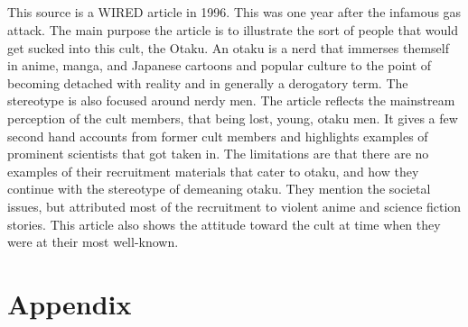 \documentclass[12pt, letterpaper]{article}
\begin{document}
\subsection{}

This source is a WIRED article in 1996. This was one year after the infamous gas attack. The main purpose 
the article is to illustrate the sort of people that would get sucked into this cult, the Otaku. An otaku
is a nerd that immerses themself in anime, manga, and Japanese cartoons and popular culture to the point of
becoming detached with reality and in generally a derogatory term. The stereotype is also focused around 
nerdy men. The article reflects the mainstream perception of the cult members, that being lost, young, 
otaku men. It gives a few second hand accounts from former cult members and highlights examples of 
prominent scientists that got taken in. The limitations are that there are no examples of their recruitment
materials that cater to otaku, and how they continue with the stereotype of demeaning otaku. They mention
the societal issues, but attributed most of the recruitment to violent anime and science fiction stories.
This article also shows the attitude toward the cult at time when they were at their most well-known. 

\newpage
\printbibliography{}

\newpage
\section{Appendix}
\end{document}
